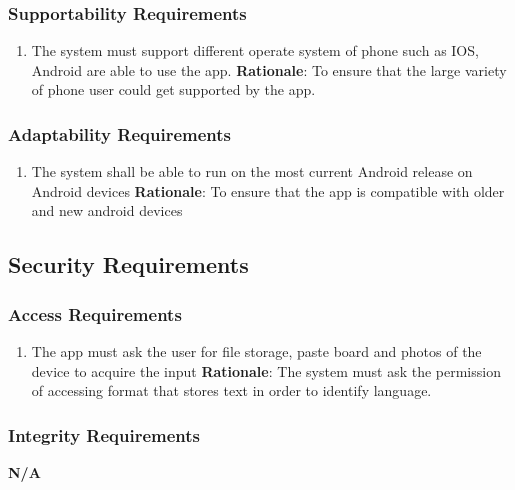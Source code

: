 \subsubsection{Supportability Requirements}
\label{ssub:supportability_requirements}
\begin{enumerate}[{MS-S}1. ]
	\item The system must support different operate system of phone such as IOS, Android are able to use the app. 
	\textbf{Rationale}: To ensure that the large variety of phone user could get supported by the app. 
\end{enumerate}

\subsubsection{Adaptability Requirements}
\label{ssub:adaptability_requirements}
\begin{enumerate}[{MS-A}1. ]
	\item The system shall be able to run on the most current Android release on Android devices 
	\textbf{Rationale}: To ensure that the app is compatible with older and new android devices
\end{enumerate}


\subsection{Security Requirements}
\label{sub:security_requirements}

\subsubsection{Access Requirements}
\label{ssub:access_requirements}
\begin{enumerate}[{SR-AC}1. ]
	\item The app must ask the user for file storage, paste board and photos of the device to acquire the input 
	\textbf{Rationale}: The system must ask the permission of accessing format that stores text in order to identify language. 
\end{enumerate}

\subsubsection{Integrity Requirements}
\label{ssub:integrity_requirements}
\textbf{N/A}

